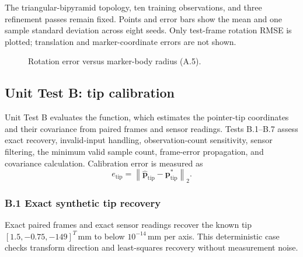 \documentclass[11pt]{article}
\newcommand{\vct}[1]{\bm{#1}}
\newcommand{\norm}[1]{\left\|#1\right\|_2}
\begin{document}
The triangular-bipyramid topology, ten training observations, and three
refinement passes remain fixed.  Points and error bars show the mean and one
sample standard deviation across eight seeds.  Only test-frame rotation RMSE
is plotted; translation and marker-coordinate errors are not shown.

\begin{figure}[H]
\centering
{}
\caption{Rotation error versus marker-body radius (A.5).}
\label{fig:validation-marker-radius}
\end{figure}

\subsection{Unit Test B: tip calibration}
Unit Test B evaluates the  function, which
estimates the pointer-tip coordinates and their covariance from paired frames
and sensor readings.  Tests B.1--B.7 assess exact recovery, invalid-input
handling, observation-count sensitivity, sensor filtering, the minimum valid
sample count, frame-error propagation, and covariance calculation.
Calibration error is measured as
\begin{equation}
e_{\mathrm{tip}}
=\norm{\widehat{\vct p}_{\mathrm{tip}}-\vct p_{\mathrm{tip}}^*}.
\end{equation}

\subsubsection*{B.1 Exact synthetic tip recovery}
Exact paired frames and exact sensor readings recover the known tip
$[1.5,-0.75,-149]^T\,\mathrm{mm}$ to below $10^{-14}\,\mathrm{mm}$ per
axis.  This deterministic case checks transform direction and least-squares
recovery without measurement noise.
\end{document}
